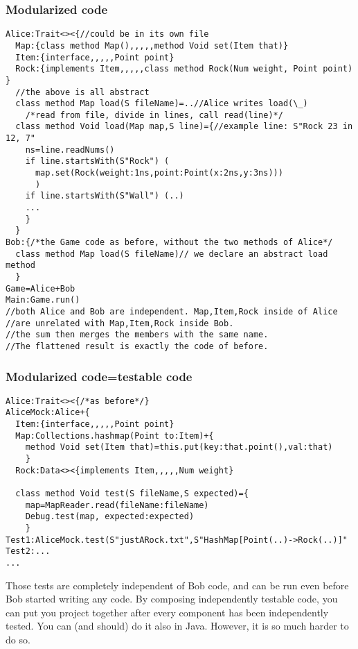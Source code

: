\begin{frame}[fragile]
\frametitle{Modularized code}
\begin{NiceCode}{59ex}{0.7}
\begin{lstlisting}
Alice:Trait<><{//could be in its own file
  Map:{class method Map(),,,,,method Void set(Item that)}
  Item:{interface,,,,,Point point}
  Rock:{implements Item,,,,,class method Rock(Num weight, Point point) }
  //the above is all abstract
  class method Map load(S fileName)=..//Alice writes load(\_)
    /*read from file, divide in lines, call read(line)*/
  class method Void load(Map map,S line)={//example line: S"Rock 23 in 12, 7"
    ns=line.readNums()
    if line.startsWith(S"Rock") (
      map.set(Rock(weight:1ns,point:Point(x:2ns,y:3ns)))
      )
    if line.startsWith(S"Wall") (..)
    ...
    }
  }
Bob:{/*the Game code as before, without the two methods of Alice*/
  class method Map load(S fileName)// we declare an abstract load method
  }
Game=Alice+Bob
Main:Game.run()
//both Alice and Bob are independent. Map,Item,Rock inside of Alice
//are unrelated with Map,Item,Rock inside Bob.
//the sum then merges the members with the same name.
//The flattened result is exactly the code of before.
\end{lstlisting}
\end{NiceCode}
\end{frame}

\begin{frame}[fragile]
\frametitle{Modularized code=testable code}
\begin{NiceCode}{59ex}{0.7}
\begin{lstlisting}
Alice:Trait<><{/*as before*/}
AliceMock:Alice+{
  Item:{interface,,,,,Point point}
  Map:Collections.hashmap(Point to:Item)+{
    method Void set(Item that)=this.put(key:that.point(),val:that)
    }
  Rock:Data<><{implements Item,,,,,Num weight}

  class method Void test(S fileName,S expected)={
    map=MapReader.read(fileName:fileName)
    Debug.test(map, expected:expected)
    }
Test1:AliceMock.test(S"justARock.txt",S"HashMap[Point(..)->Rock(..)]"
Test2:...
...
\end{lstlisting}
\end{NiceCode}
Those tests are completely independent of Bob code, and can be run even before
Bob started writing any code.
By composing independently testable code, you can put you project together
after every component has been independently tested.
You can (and should) do it also in Java.
However, it is so much harder to do so.
\end{frame}


